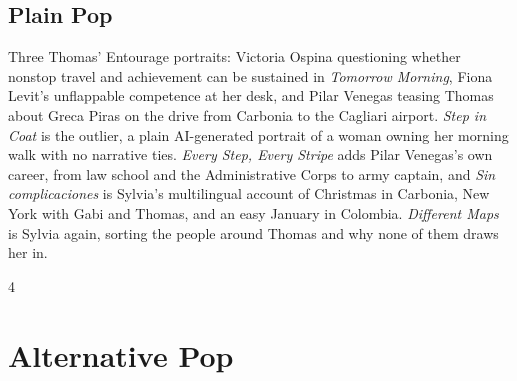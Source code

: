 \documentclass[a4paper,landscape]{memoir}
\begin{document}
\chapter{Plain Pop}
Three Thomas' Entourage portraits: Victoria Ospina questioning whether nonstop travel and achievement can be sustained in \emph{Tomorrow Morning}, Fiona Levit's unflappable competence at her desk, and Pilar Venegas teasing Thomas about Greca Piras on the drive from Carbonia to the Cagliari airport. \emph{Step in Coat} is the outlier, a plain AI-generated portrait of a woman owning her morning walk with no narrative ties. \emph{Every Step, Every Stripe} adds Pilar Venegas’s own career, from law school and the Administrative Corps to army captain, and \emph{Sin complicaciones} is Sylvia's multilingual account of Christmas in Carbonia, New York with Gabi and Thomas, and an easy January in Colombia. \emph{Different Maps} is Sylvia again, sorting the people around Thomas and why none of them draws her in.
\clearpage\begin{multicols*}{4}
\end{multicols*}

\part{Alternative Pop}
\end{document}
